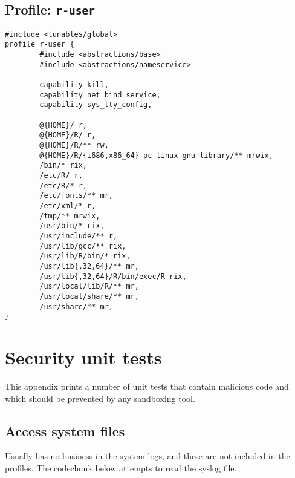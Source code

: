 \section{Profile: \texttt{r-user}}
\label{r-user}

\begin{footnotesize}
\begin{verbatim}
#include <tunables/global>
profile r-user {
        #include <abstractions/base>
        #include <abstractions/nameservice>
	
        capability kill,
        capability net_bind_service,
        capability sys_tty_config,
	
        @{HOME}/ r,
        @{HOME}/R/ r,
        @{HOME}/R/** rw,
        @{HOME}/R/{i686,x86_64}-pc-linux-gnu-library/** mrwix,
        /bin/* rix,
        /etc/R/ r,
        /etc/R/* r,
        /etc/fonts/** mr,
        /etc/xml/* r,
        /tmp/** mrwix,
        /usr/bin/* rix,
        /usr/include/** r,
        /usr/lib/gcc/** rix,		
        /usr/lib/R/bin/* rix,
        /usr/lib{,32,64}/** mr,
        /usr/lib{,32,64}/R/bin/exec/R rix,
        /usr/local/lib/R/** mr,
        /usr/local/share/** mr,
        /usr/share/** mr,
}
\end{verbatim}
\end{footnotesize}



\chapter{Security unit tests}

This appendix prints a number of unit tests that contain malicious code and
which should be prevented by any sandboxing tool.

\section{Access system files}

Usually \R has no business in the system logs, and these are not included in
the profiles. The codechunk below attempts to read the syslog file.

\begin{knitrout}\mycodesize
{}\color{fgcolor}\begin{kframe}
\begin{alltt}
 \hlkwb{<-} \hlstd{() \{}
    \hlstd{(}\hlstd{)}
\hlstd{\}}
\end{alltt}
\end{kframe}
\end{knitrout}


